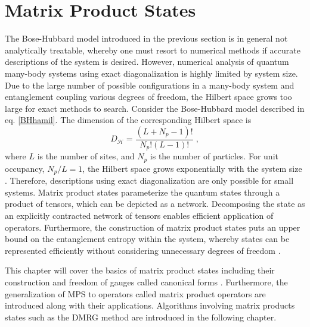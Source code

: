 \chapter{Matrix Product States} \label{chap:MPS}
The Bose-Hubbard model introduced in the previous section is in general not analytically treatable, whereby one must resort to numerical methods if accurate descriptions of the system is desired.
However, numerical analysis of quantum many-body systems using exact diagonalization is highly limited by system size. Due to the large number of possible configurations in a many-body system and entanglement coupling various degrees of freedom, the Hilbert space grows too large for exact methods to search.
Consider the Bose-Hubbard model described in eq. \eqref{BHhamil}. The dimension of the corresponding Hilbert space is
\begin{equation}
	D_{\mathcal{H}} = \frac{(L+N_p -1)!}{N_p ! (L-1)!} \; ,
	\label{eq:HilberSpaceScaling}
\end{equation}
where $L$ is the number of sites, and $N_p$ is the number of particles. For unit occupancy, $N_p / L = 1$, the Hilbert space grows exponentially with the system size \cite{Dong}. Therefore, descriptions using exact diagonalization are only possible for small systems.
Matrix product states parameterize the quantum states through a product of tensors, which can be depicted as a network. Decomposing the state as an explicitly contracted network of tensors enables efficient application of operators. Furthermore, the construction of matrix product states puts an upper bound on the entanglement entropy within the system, whereby states can be represented efficiently without considering unnecessary degrees of freedom \cite{Cramer}.

This chapter will cover the basics of matrix product states including their construction and freedom of gauges called canonical forms \cite{schollwock}. Furthermore, the generalization of MPS to operators called matrix product operators are introduced along with their applications. Algorithms involving matrix products states such as the DMRG method \cite{White1992,White1993} are introduced in the following chapter.


